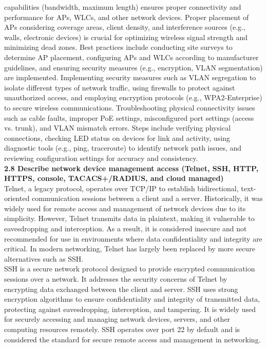 \documentclass{article}
\begin{document}
capabilities (bandwidth, maximum length) ensures proper connectivity and performance for APs, WLCs, and other network devices. Proper placement of APs considering coverage areas, client density, and interference sources (e.g., walls, electronic devices) is crucial for optimizing wireless signal strength and minimizing dead zones. Best practices include conducting site surveys to determine AP placement, configuring APs and WLCs according to manufacturer guidelines, and ensuring security measures (e.g., encryption, VLAN segmentation) are implemented. Implementing security measures such as VLAN segregation to isolate different types of network traffic, using firewalls to protect against unauthorized access, and employing encryption protocols (e.g., WPA2-Enterprise) to secure wireless communications. Troubleshooting physical connectivity issues such as cable faults, improper PoE settings, misconfigured port settings (access vs. trunk), and VLAN mismatch errors. Steps include verifying physical connections, checking LED status on devices for link and activity, using diagnostic tools (e.g., ping, traceroute) to identify network path issues, and reviewing configuration settings for accuracy and consistency.\\
  
\textbf{2.8 Describe network device management access (Telnet, SSH, HTTP, HTTPS, console, TACACS+/RADIUS, and cloud managed)}\\

	Telnet, a legacy protocol, operates over TCP/IP to establish bidirectional, text-oriented communication sessions between a client and a server. Historically, it was widely used for remote access and management of network devices due to its simplicity. However, Telnet transmits data in plaintext, making it vulnerable to eavesdropping and interception. As a result, it is considered insecure and not recommended for use in environments where data confidentiality and integrity are critical. In modern networking, Telnet has largely been replaced by more secure alternatives such as SSH.\\
	
	SSH is a secure network protocol designed to provide encrypted communication sessions over a network. It addresses the security concerns of Telnet by encrypting data exchanged between the client and server. SSH uses strong encryption algorithms to ensure confidentiality and integrity of transmitted data, protecting against eavesdropping, interception, and tampering. It is widely used for securely accessing and managing network devices, servers, and other computing resources remotely. SSH operates over port 22 by default and is considered the standard for secure remote access and management in networking.\\
	
\end{document}
